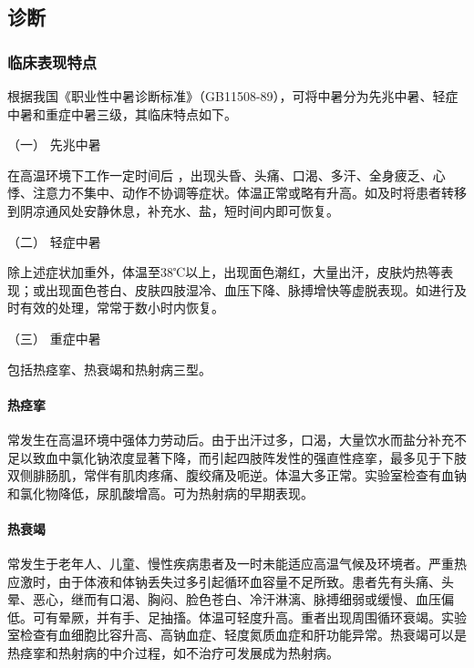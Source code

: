 \subsection{诊断}

\subsubsection{临床表现特点}

根据我国《职业性中暑诊断标准》（GB11508-89），可将中暑分为先兆中暑、轻症中暑和重症中暑三级，其临床特点如下。

\hypertarget{text00354.htmlux5cux23CHP15-1-2-1-1}{}
（一） 先兆中暑

在高温环境下工作一定时间后
，出现头昏、头痛、口渴、多汗、全身疲乏、心悸、注意力不集中、动作不协调等症状。体温正常或略有升高。如及时将患者转移到阴凉通风处安静休息，补充水、盐，短时间内即可恢复。

\hypertarget{text00354.htmlux5cux23CHP15-1-2-1-2}{}
（二） 轻症中暑

除上述症状加重外，体温至38℃以上，出现面色潮红，大量出汗，皮肤灼热等表现；或出现面色苍白、皮肤四肢湿冷、血压下降、脉搏增快等虚脱表现。如进行及时有效的处理，常常于数小时内恢复。

\hypertarget{text00354.htmlux5cux23CHP15-1-2-1-3}{}
（三） 重症中暑

包括热痉挛、热衰竭和热射病三型。

\paragraph{热痉挛}

常发生在高温环境中强体力劳动后。由于出汗过多，口渴，大量饮水而盐分补充不足以致血中氯化钠浓度显著下降，而引起四肢阵发性的强直性痉挛，最多见于下肢双侧腓肠肌，常伴有肌肉疼痛、腹绞痛及呃逆。体温大多正常。实验室检查有血钠和氯化物降低，尿肌酸增高。可为热射病的早期表现。

\paragraph{热衰竭}

常发生于老年人、儿童、慢性疾病患者及一时未能适应高温气候及环境者。严重热应激时，由于体液和体钠丢失过多引起循环血容量不足所致。患者先有头痛、头晕、恶心，继而有口渴、胸闷、脸色苍白、冷汗淋漓、脉搏细弱或缓慢、血压偏低。可有晕厥，并有手、足抽搐。体温可轻度升高。重者出现周围循环衰竭。实验室检查有血细胞比容升高、高钠血症、轻度氮质血症和肝功能异常。热衰竭可以是热痉挛和热射病的中介过程，如不治疗可发展成为热射病。

